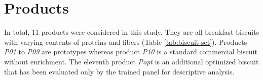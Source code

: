 \documentclass[
]{krantz}
\begin{document}
\hypertarget{products}{%
\section{Products}\label{products}}

In total, 11 products were considered in this study. They are all breakfast biscuits with varying contents of proteins and fibers (Table \ref{tab:biscuit-set}). Products \emph{P01} to \emph{P09} are prototypes whereas product \emph{P10} is a standard commercial biscuit without enrichment. The eleventh product \emph{Popt} is an additional optimized biscuit that has been evaluated only by the trained panel for descriptive analysis.

\providecommand{\docline}[3]{\noalign{\global\setlength{\arrayrulewidth}{#1}}\arrayrulecolor[HTML]{#2}\cline{#3}}

\setlength{\tabcolsep}{0pt}

\renewcommand*{\arraystretch}{1.5}
\end{document}
